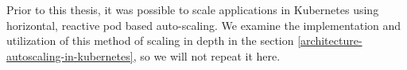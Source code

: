 Prior to this thesis, it was possible to scale applications in
Kubernetes using horizontal, reactive pod based auto-scaling. We examine the implementation
and utilization of this method of scaling in depth in the section
\ref{architecture-autoscaling-in-kubernetes}, so we will not repeat it here.
